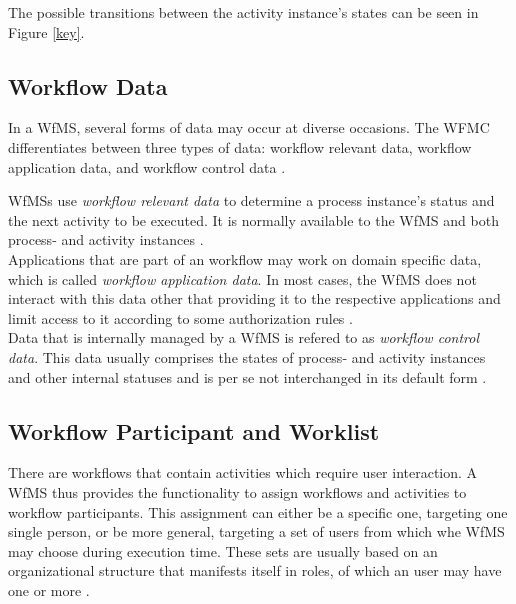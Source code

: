     The possible transitions between the activity instance's states can be seen in Figure \ref{key}.

  \subsection{Workflow Data} %
  \label{sub:workflow_data}
    In a \ac{WfMS}, several forms of data may occur at diverse occasions. The \ac{WFMC} differentiates between three types of data: workflow relevant data, workflow application data, and workflow control data \cite{Hollingsworth1995Wfmc}.

    \ac{WfMS}s use \emph{workflow relevant data} to determine a process instance's status and the next activity to be executed. It is normally available to the \ac{WfMS} and both process- and activity instances \cite{Hollingsworth1995Wfmc}. \\
    Applications that are part of an workflow may work on domain specific data, which is called \emph{workflow application data}. In most cases, the \ac{WfMS} does not interact with this data other that providing it to the respective applications and limit access to it according to some authorization rules \cite{Hollingsworth1995Wfmc,Casati1999Specification}. \\
    Data that is internally managed by a \ac{WfMS} is refered to as \emph{workflow control data}. This data usually comprises the states of process- and activity instances and other internal statuses and is per se not interchanged in its default form \cite{Hollingsworth1995Wfmc,Casati1999Specification}.

  \subsection{Workflow Participant and Worklist} %
  \label{sub:workflow_participants}
    There are workflows that contain activities which require user interaction. A \ac{WfMS} thus provides the functionality to assign workflows and activities to workflow participants. This assignment can either be a specific one, targeting one single person, or be more general, targeting a set of users from which whe \ac{WfMS} may choose during execution time. These sets are usually based on an organizational structure that manifests itself in roles, of which an user may have one or more \cite{Hollingsworth1995Wfmc,Casati1999Specification}.

